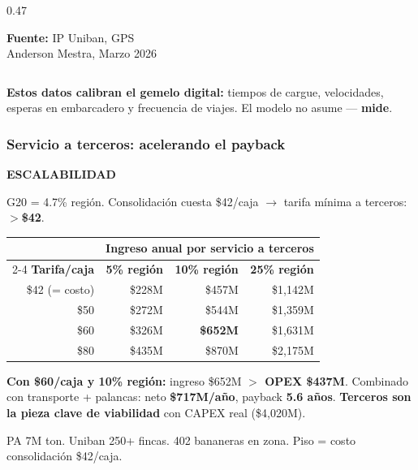 \documentclass[aspectratio=169, 10pt]{beamer}
\newcommand{\tagline}[2]{{\scriptsize\color{#1}\textbf{\MakeUppercase{#2}}}}
\begin{document}
\begin{frame}
\begin{columns}[T]
\begin{column}{0.47\textwidth}
\vspace{4pt}
\colorbox{grisclaro}{\parbox{\dimexpr\linewidth-8pt}{\tiny\strut
\textcolor{gris}{\textbf{Fuente:}} IP Uniban, GPS\\
Anderson Mestra, Marzo 2026\strut}}
\end{column}
\end{columns}

\vspace{4pt}
\colorbox{verdeclaro}{\parbox{\dimexpr\textwidth-12pt}{\scriptsize\strut
\textcolor{verde}{\textbf{Estos datos calibran el gemelo digital:}} tiempos de cargue, velocidades,
esperas en embarcadero y frecuencia de viajes. El modelo no asume --- \textbf{mide}.\strut}}
\end{frame}

\begin{frame}
\frametitle{Servicio a terceros: acelerando el payback}
\tagline{cian}{Escalabilidad}
\vspace{-2pt}

{\scriptsize G20 = 4.7\% regi\'on. Consolidaci\'on cuesta \$42/caja $\rightarrow$ tarifa m\'inima a terceros: \textbf{$>$\$42}.}

\vspace{4pt}
\begin{center}
\scriptsize
\renewcommand{\arraystretch}{1.1}
\begin{tabular}{r r r r}
    \toprule
    & \multicolumn{3}{c}{\textbf{Ingreso anual por servicio a terceros}} \\
    \cmidrule(lr){2-4}
    \textbf{Tarifa/caja} & \textbf{5\% regi\'on} & \textbf{10\% regi\'on} & \textbf{25\% regi\'on} \\
    \midrule
    \rowcolor{rojoclaro}
    {\color{gris}\$42 (= costo)} & {\color{gris}\$228M} & {\color{gris}\$457M} & {\color{gris}\$1,142M} \\
    \$50  & \$272M & \$544M & \$1,359M \\
    \$60  & \$326M & \textcolor{verde}{\textbf{\$652M}} & \$1,631M \\
    \$80  & \$435M & \$870M & \$2,175M \\
    \bottomrule
\end{tabular}
\end{center}

\vspace{4pt}
\colorbox{verdeclaro}{\parbox{\dimexpr\textwidth-12pt}{\scriptsize\strut
\textcolor{verde}{\textbf{Con \$60/caja y 10\% regi\'on:}} ingreso \$652M \textbf{$>$ OPEX \$437M}.
Combinado con transporte + palancas: neto \textbf{\$717M/a\~no}, payback \textbf{5.6 a\~nos}.
\textbf{Terceros son la pieza clave de viabilidad} con CAPEX real (\$4,020M).\strut}}

\vspace{1pt}
{\tiny\color{gris} PA 7M ton. Uniban 250+ fincas. 402 bananeras en zona. Piso = costo consolidaci\'on \$42/caja.}
\end{frame}
\end{document}
